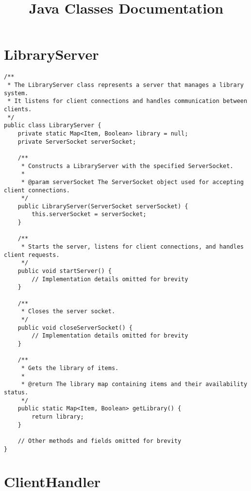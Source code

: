 \documentclass{article}
\begin{document}
\title{Java Classes Documentation}
\author{}
\date{}
\maketitle

\section{LibraryServer}

\begin{lstlisting}[caption={LibraryServer.java}]
/**
 * The LibraryServer class represents a server that manages a library system.
 * It listens for client connections and handles communication between clients.
 */
public class LibraryServer {
    private static Map<Item, Boolean> library = null;
    private ServerSocket serverSocket;

    /**
     * Constructs a LibraryServer with the specified ServerSocket.
     *
     * @param serverSocket The ServerSocket object used for accepting client connections.
     */
    public LibraryServer(ServerSocket serverSocket) {
        this.serverSocket = serverSocket;
    }

    /**
     * Starts the server, listens for client connections, and handles client requests.
     */
    public void startServer() {
        // Implementation details omitted for brevity
    }

    /**
     * Closes the server socket.
     */
    public void closeServerSocket() {
        // Implementation details omitted for brevity
    }

    /**
     * Gets the library of items.
     *
     * @return The library map containing items and their availability status.
     */
    public static Map<Item, Boolean> getLibrary() {
        return library;
    }

    // Other methods and fields omitted for brevity
}
\end{lstlisting}

\section{ClientHandler}
\end{document}

